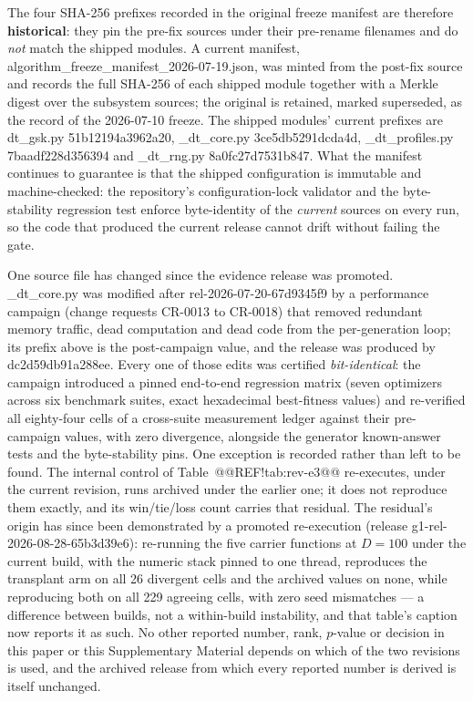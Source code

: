 \documentclass[10pt,a4paper]{article}
\begin{document}
\noindent The four SHA-256 prefixes recorded in the original freeze manifest are
therefore \textbf{historical}: they pin the pre-fix sources under their pre-rename
filenames and do \emph{not} match the shipped modules. A current manifest,
algorithm\_freeze\_manifest\_2026-07-19.json, was minted from the
post-fix source and records the full SHA-256 of each shipped module together
with a Merkle digest over the subsystem sources; the original is retained,
marked superseded, as the record of the 2026-07-10 freeze. The shipped modules'
current prefixes are
dt\_gsk.py 51b12194a3962a20,
\_dt\_core.py 3ce5db5291dcda4d,
\_dt\_profiles.py 7baadf228d356394 and
\_dt\_rng.py 8a0fc27d7531b847.
What the manifest continues to guarantee is that the shipped configuration is
immutable and machine-checked: the repository's configuration-lock validator and
the byte-stability regression test enforce byte-identity of the \emph{current}
sources on every run, so the code that produced the current release cannot drift
without failing the gate.


\noindent One source file has changed since the evidence release was promoted.
\_dt\_core.py was modified after \mbox{rel-2026-07-20-67d9345f9} by a
performance campaign (change requests CR-0013 to CR-0018) that removed redundant
memory traffic, dead computation and dead code from the per-generation loop; its
prefix above is the post-campaign value, and the release was produced by
dc2d59db91a288ee. Every one of those edits was certified
\emph{bit-identical}: the campaign introduced a pinned end-to-end regression
matrix (seven optimizers across six benchmark suites, exact hexadecimal
\mbox{best-fitness} values) and re-verified all eighty-four cells of a
cross-suite measurement ledger against their pre-campaign values, with zero
divergence, alongside the generator known-answer tests and the byte-stability
pins. One exception is recorded rather than left to be found. The internal
control of Table~@@REF!tab:rev-e3@@ re-executes, under the current revision,
runs archived under the earlier one; it does not reproduce them exactly, and
its win/tie/loss count carries that residual. The residual's origin has since
been demonstrated by a promoted re-execution (release g1-rel-2026-08-28-65b3d39e6):
re-running the five carrier functions at $D = 100$ under the current build,
with the numeric stack pinned to one thread, reproduces the transplant arm on
all 26 divergent cells and the archived values on none, while reproducing
both on all 229 agreeing cells, with zero seed mismatches --- a difference
between builds, not a within-build instability, and that table's caption now
reports it as such. No other reported number, rank, $p$-value or decision
in this paper or this Supplementary Material depends on which of the two
revisions is used, and the archived release from which every reported number
is derived is itself unchanged.
\end{document}
